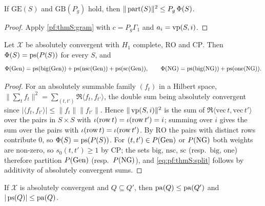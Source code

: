 \begin{lemma}\label{pf:thmS:price}
If $\mathrm{GE}(S)$ and $\mathrm{GB}(P_g)$ hold, then $\|\operatorname{part}(S)\|^2\le P_g\,\Phi(S)$.
\end{lemma}

\begin{proof}
Apply \cref{pf:thmS:gram} with $c=P_g\Gamma_1$ and $a_i=\operatorname{vp}(S,i)$.
\end{proof}

\begin{lemma}\label{pf:thmS:pairsplit}
Let $\mathcal X$ be absolutely convergent with $H_1$ complete, $\mathrm{RO}$ and $\mathrm{CP}$. Then
$\Phi(S)=\operatorname{ps}(P(S))$ for every $S$, and
\begin{equation}\label{eq:pf:thmS:split}
\Phi(\mathrm{Gen})=\operatorname{ps}(\mathrm{big}(\mathrm{Gen}))+\operatorname{ps}(\mathrm{nsc}(\mathrm{Gen}))+\operatorname{ps}(\mathrm{sc}(\mathrm{Gen})),\qquad
\Phi(\mathrm{NG})=\operatorname{ps}(\mathrm{big}(\mathrm{NG}))+\operatorname{ps}(\mathrm{one}(\mathrm{NG})).
\end{equation}
\end{lemma}

\begin{proof}
For an absolutely summable family $(f_t)$ in a Hilbert space, $\|\sum_tf_t\|^2=\sum_{(t,t')}\Re\langle f_t,f_{t'}\rangle$,
the double sum being absolutely convergent since $|\langle f_t,f_{t'}\rangle|\le\|f_t\|\|f_{t'}\|$. Hence
$\|\operatorname{vp}(S,i)\|^2$ is the sum of $\Re\langle\mathrm{vec}\,t,\mathrm{vec}\,t'\rangle$ over the pairs in $S\times S$
with $\iota(\operatorname{row} t)=\iota(\operatorname{row} t')=i$; summing over $i$ gives the sum over the pairs with
$\iota(\operatorname{row} t)=\iota(\operatorname{row} t')$. By $\mathrm{RO}$ the pairs with distinct rows contribute $0$, so
$\Phi(S)=\operatorname{ps}(P(S))$. For $(t,t')\in P(\mathrm{Gen})$ or $P(\mathrm{NG})$ both weights are non-zero, so $s_0(t,t')\ge1$ by
$\mathrm{CP}$; the sets $\mathrm{big}$, $\mathrm{nsc}$, $\mathrm{sc}$ (resp.\ $\mathrm{big}$, $\mathrm{one}$)
therefore partition $P(\mathrm{Gen})$ (resp.\ $P(\mathrm{NG})$), and \eqref{eq:pf:thmS:split} follows by additivity of
absolutely convergent sums.
\end{proof}

\begin{lemma}\label{pf:thmS:subfamily}
If $\mathcal X$ is absolutely convergent and $Q\subseteq Q'$, then $\operatorname{pa}(Q)\le\operatorname{pa}(Q')$ and
$|\operatorname{ps}(Q)|\le\operatorname{pa}(Q)$.
\end{lemma}

